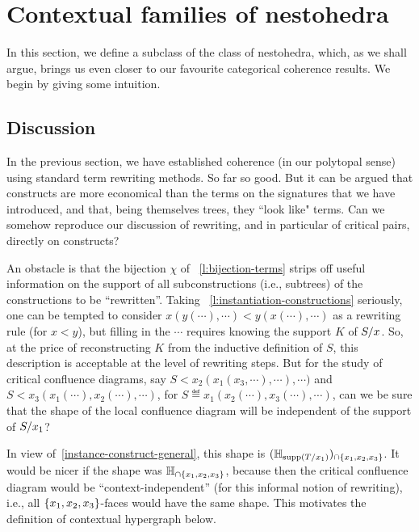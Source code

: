 
\section{Contextual families of nestohedra} 
\label{s:contextual}

In this section, we define a subclass of the class of  nestohedra, which, as we shall argue, brings us even closer to
our favourite categorical coherence results. We begin by giving some intuition.

\subsection{Discussion} \label{contextual-discussion}

In the previous section, we have established coherence (in our polytopal sense) using standard term rewriting methods. So far so good. But  it can be argued that constructs are more economical than the terms on the signatures that we have introduced, and that, being themselves trees, they ``look like" terms. 
Can we somehow reproduce our discussion of rewriting, and in particular of critical pairs, directly on constructs?

An obstacle is that the bijection $\chi$ of~ \cref{l:bijection-terms} strips off useful information on the support of all subconstructions (i.e.,  subtrees) of the constructions to be ``rewritten''. 
Taking~ \cref{l:instantiation-constructions} seriously, one can be tempted to consider $x(y(\cdots),\cdots)< y(x(\cdots),\cdots)$ as a rewriting rule (for $x<y$), but filling in the $\cdots$ requires knowing the support $K$ of $S/x$. 
So, at the price of reconstructing $K$ from the inductive definition of $S$, this description is acceptable at the level of rewriting steps. But for the study of critical confluence diagrams, say   $S < x_2(x_1(x_3,\cdots),\cdots),\cdots)$ and $S < x_3(x_1(\cdots),x_2(\cdots),\cdots)$, for $S\eqdef  x_1(x_2(\cdots),x_3(\cdots),\cdots)$, can we be sure that the shape of the local confluence diagram will be independent of the support of $S/x_1$?  

In view of~\cref{instance-construct-general}, this shape is
$({\mathbb H}_{\mathrm{supp}(T/x_1)})_{\cap \left\{x_1,x_2,x_3\right\}}$. 
It would be nicer if the shape was ${\mathbb H}_{\cap \left\{x_1,x_2,x_3\right\}}$, because then the critical confluence diagram would be ``context-independent'' (for this informal notion of rewriting), i.e., all $\left\{x_1,x_2,x_3\right\}$-faces would have the same shape.
This motivates the definition of contextual hypergraph below. 


